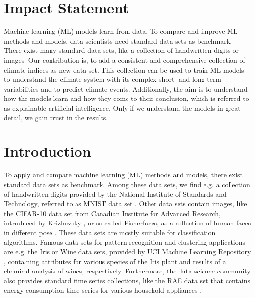 \documentclass{CUP-JNL-DTM}%
\theoremstyle{definition}
\numberwithin{equation}{section}
\begin{document}
\section*{Impact Statement}
Machine learning (ML) models learn from data. To compare and improve ML methods and models, data scientists need standard data sets as benchmark. There exist many standard data sets, like a collection of handwritten digits or images. Our contribution is, to add a consistent and comprehensive collection of climate indices as new data set. This collection can be used to train ML models to understand the climate system with its complex short- and long-term variabilities and to predict climate events. Additionally, the aim is to understand how the models learn and how they come to their conclusion, which is referred to as explainable artificial intelligence. Only if we understand the models in great detail, we gain trust in the results.

\section{Introduction \label{sec:Introduction}}

To apply and compare machine learning (ML) methods and models, there exist standard data sets as benchmark. Among these data sets, we find e.g. a collection of handwritten digits provided by the National Institute of Standards and Technology, referred to as MNIST data set \cite{Lecun1998}. Other data sets contain images, like the CIFAR-10 data set from Canadian Institute for Advanced Research, introduced by Krizhevsky \cite{Krizhevsky2009}, or so-called Fisherfaces, as a collection of human faces in different pose \cite{Belhumeur1997}. These data sets are mostly suitable for classification algorithms. Famous data sets for pattern recognition and clustering applications are e.g. the Iris or Wine data sets, provided by UCI Machine Learning Repository \cite{Murphy1994}, containing attributes for various species of the Iris plant and results of a chemical analysis of wines, respectively. Furthermore, the data science community also provides standard time series collections, like the RAE data set that contains energy consumption time series for various household appliances \cite{Makonin2018}. 
\end{document}
